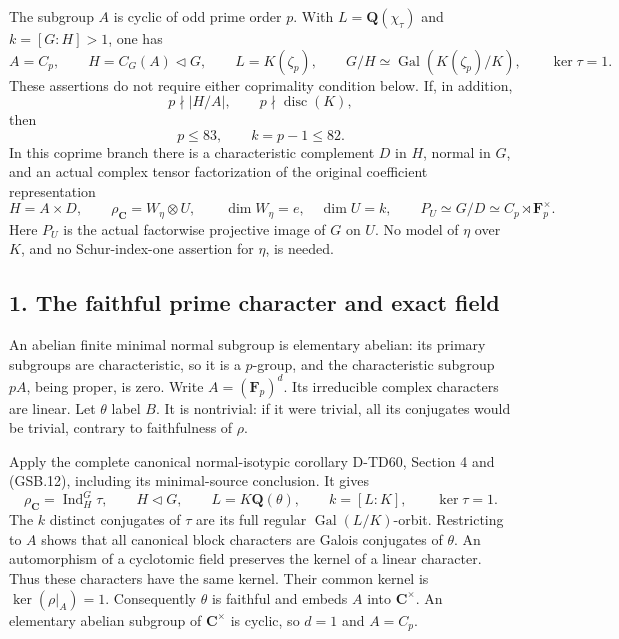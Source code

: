 \begin{theorem}
The subgroup \(A\) is cyclic of odd prime order \(p\). With
\(L=\mathbf Q(\chi_\tau)\) and \(k=[G:H]>1\), one has
\[
 A=C_p,\qquad H=C_G(A)\triangleleft G,\qquad
 L=K(\zeta_p),\qquad
 G/H\simeq\operatorname{Gal}(K(\zeta_p)/K),\qquad
 \ker\tau=1.
 \tag{CAC.1}
\]
These assertions do not require either coprimality condition below.
If, in addition,
\[
             p\nmid |H/A|,\qquad p\nmid\operatorname{disc}(K),
 \tag{CAC.2}
\]
then
\[
                    p\le83,\qquad k=p-1\le82.
 \tag{CAC.3}
\]
In this coprime branch there is a characteristic complement \(D\) in
\(H\), normal in \(G\), and an actual complex tensor factorization of
the original coefficient representation
\[
 H=A\times D,\qquad
 \rho_{\mathbf C}=W_\eta\otimes U,\qquad
 \dim W_\eta=e,\quad \dim U=k,\qquad
 P_U\simeq G/D\simeq C_p\rtimes\mathbf F_p^\times.
 \tag{CAC.4}
\]
Here \(P_U\) is the actual factorwise projective image of \(G\) on
\(U\). No model of \(\eta\) over \(K\), and no Schur-index-one
assertion for \(\eta\), is needed.
\end{theorem}

\subsection*{1. The faithful prime character and exact field}

An abelian finite minimal normal subgroup is elementary abelian:
its primary subgroups are characteristic, so it is a \(p\)-group,
and the characteristic subgroup \(pA\), being proper, is zero.
Write \(A=(\mathbf F_p)^d\). Its irreducible complex characters
are linear. Let \(\theta\) label \(B\). It is nontrivial: if it
were trivial, all its conjugates would be trivial, contrary to
faithfulness of \(\rho\).

Apply the complete canonical normal-isotypic corollary D-TD60,
Section 4 and (GSB.12), including its minimal-source conclusion.
It gives
\[
 \rho_{\mathbf C}=\operatorname{Ind}_H^G\tau,\qquad
 H\triangleleft G,\qquad
 L=K\mathbf Q(\theta),\qquad
 k=[L:K],\qquad
 \ker\tau=1.
 \tag{CAC.5}
\]
The \(k\) distinct conjugates of \(\tau\) are its full regular
\(\operatorname{Gal}(L/K)\)-orbit. Restricting to \(A\) shows that
all canonical block characters are Galois conjugates of \(\theta\).
An automorphism of a cyclotomic field preserves the kernel of a
linear character. Thus these characters have the same kernel.
Their common kernel is \(\ker(\rho|_A)=1\). Consequently \(\theta\)
is faithful and embeds \(A\) into \(\mathbf C^\times\).
An elementary abelian subgroup of \(\mathbf C^\times\) is cyclic,
so \(d=1\) and \(A=C_p\).

